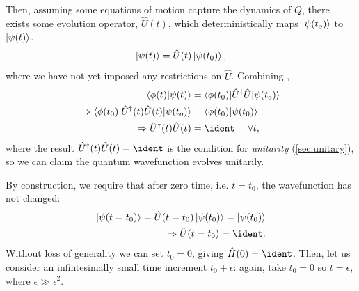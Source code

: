 Then, assuming some equations of motion capture the dynamics of $Q$, 
    there exists some evolution operator, $\hat{U}(t)$, which deterministically maps $\ket{\psi(t_o)}$ to $\ket{\psi(t)}$.
\begin{equation}
    \label{eqn:unitary_time_evolution}
    \ket{\psi(t)} = \hat{U}(t) \ket{\psi(t_0)},
\end{equation}
    where we have not yet imposed any restrictions on $\hat{U}$. 
Combining , 
\begin{equation}
    \begin{split}
        \braket{\phi(t) | \psi(t)} &= \braket{ \phi(t_0) | \hat{U}^{\dag} \hat{U}| \psi(t_o) }
        \\
        \Rightarrow \braket{ \phi(t_0) | \hat{U}^{\dag}(t) \hat{U}(t) | \psi(t_o) } &= \braket{\phi(t_0) | \psi(t_0)}
        \\
        \Rightarrow \hat{U}^{\dag}(t) \hat{U}(t) &= \ident \ \ \ \ \forall t,
    \end{split}
\end{equation}
where the result $\hat{U}^{\dag}(t) \hat{U}(t) = \ident$ is the condition for \emph{unitarity} (\cref{sec:unitary}), 
    so we can claim the quantum wavefunction evolves unitarily. 
\par 

By construction, we require that after zero time, i.e. $t = t_0$, the wavefunction has not changed:
\begin{equation}
    \begin{split}
        \ket{\psi(t = t_0)} = \hat{U}(t = t_0)\ket{\psi(t_0)} = \ket{\psi(t_0)}
        \\ \Rightarrow \hat{U}(t = t_0) = \ident.
    \end{split}
\end{equation}
Without loss of generality we can set $t_0 = 0$, giving $\hat{H}(0) = \ident$. 
Then, let us consider an infintesimally small time increment $t_0 + \epsilon$:
    again, take $t_0 = 0$ so $t = \epsilon$,  where $\epsilon \gg \epsilon^2$. 

